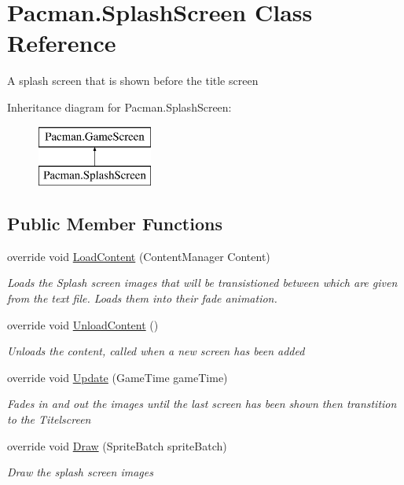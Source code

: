 \hypertarget{class_pacman_1_1_splash_screen}{\section{Pacman.\-Splash\-Screen Class Reference}
\label{class_pacman_1_1_splash_screen}
}


A splash screen that is shown before the title screen  


Inheritance diagram for Pacman.\-Splash\-Screen\-:\begin{figure}[H]
\begin{center}
\leavevmode
\includegraphics[height=2.000000cm]{class_pacman_1_1_splash_screen}
\end{center}
\end{figure}
\subsection*{Public Member Functions}
\begin{DoxyCompactItemize}
\item 
override void \hyperlink{class_pacman_1_1_splash_screen_a05a5f91c7e0ded6cb4893da9eeb0ded1}{Load\-Content} (Content\-Manager Content)
\begin{DoxyCompactList}\small\item\em Loads the Splash screen images that will be transistioned between which are given from the text file. Loads them into their fade animation. \end{DoxyCompactList}\item 
override void \hyperlink{class_pacman_1_1_splash_screen_ac72328daa3003fa228218c65660c8d6c}{Unload\-Content} ()
\begin{DoxyCompactList}\small\item\em Unloads the content, called when a new screen has been added \end{DoxyCompactList}\item 
override void \hyperlink{class_pacman_1_1_splash_screen_af64e74cca5e74b0104f9fe74a21e52ae}{Update} (Game\-Time game\-Time)
\begin{DoxyCompactList}\small\item\em Fades in and out the images until the last screen has been shown then transtition to the Titelscreen \end{DoxyCompactList}\item 
override void \hyperlink{class_pacman_1_1_splash_screen_a669ad3120d15e6eea2636e44d74cdc31}{Draw} (Sprite\-Batch sprite\-Batch)
\begin{DoxyCompactList}\small\item\em Draw the splash screen images \end{DoxyCompactList}\end{DoxyCompactItemize}
